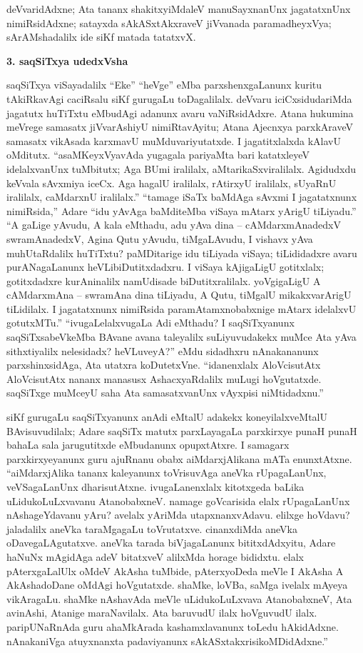 deVvaridAdxne; Ata tananx shakitxyiMdaleV manuSayxnanUnx jagatatxnUnx nimiRsidAdxne; satayxda sAkASxtAkxraveV jiVvanada paramadheyxVya; sArAMshadalilx ide siKf matada tatatxvX.

\bigskip
\begin{center}
{\Large\bf 3. saqSiTxya udedxVsha}
\end{center}

saqSiTxya viSayadalilx ``Eke'' ``heVge'' eMba parxshenxgaLanunx kuritu tAkiRkavAgi caciRsalu siKf gurugaLu toDagalilalx. deVvaru iciCxsidudariMda jagatutx huTiTxtu eMbudAgi adanunx avaru vaNiRsidAdxre. Atana hukumina meVrege samasatx jiVvarAshiyU nimiRtavAyitu; Atana Ajecnxya parxkAraveV samasatx vikAsada karxmavU muMduvariyutatxde. I jagatitxlalxda kAlavU oMditutx. ``asaMKeyxVyavAda yugagala pariyaMta bari katatxleyeV idelalxvanUnx tuMbitutx; Aga BUmi iralilalx, aMtarikaSxviralilalx. Agidudxdu keVvala sAvxmiya iceCx. Aga hagalU iralilalx, rAtirxyU iralilalx, sUyaRnU iralilalx, caMdarxnU iralilalx.'' ``tamage iSaTx baMdAga sAvxmi I jagatatxnunx nimiRsida,'' Adare ``idu yAvAga baMditeMba viSaya mAtarx yArigU tiLiyadu.'' ``A gaLige yAvudu, A kala eMthadu, adu yAva dina -- cAMdarxmAnadedxV swramAnadedxV, Agina Qutu yAvudu, tiMgaLAvudu, I vishavx yAva muhUtaRdalilx huTiTxtu? paMDitarige idu tiLiyada viSaya; tiLididadxre avaru purANagaLanunx heVLibiDutitxdadxru. I viSaya kAjigaLigU gotitxlalx; gotitxdadxre kurAninalilx namUdisade biDutitxralilalx. yoVgigaLigU A cAMdarxmAna -- swramAna dina tiLiyadu, A Qutu, tiMgalU mikakxvarArigU tiLidilalx. I jagatatxnunx nimiRsida paramAtamxnobabxnige mAtarx idelalxvU gotutxMTu.'' ``ivugaLelalxvugaLa Adi eMthadu? I saqSiTxyanunx saqSiTxsabeVkeMba BAvane avana taleyalilx suLiyuvudakekx muMce Ata yAva sithxtiyalilx nelesidadx? heVLuveyA?'' eMdu sidadhxru nAnakananunx parxshinxsidAga, Ata utatxra koDutetxVne. ``idanenxlalx AloVcisutAtx AloVcisutAtx nananx manasusx AshacxyaRdalilx muLugi hoVgutatxde. saqSiTxge muMceyU saha Ata samasatxvanUnx vAyxpisi niMtidadxnu.''

siKf gurugaLu saqSiTxyanunx anAdi eMtalU adakekx koneyilalxveMtalU BAvisuvudilalx; Adare saqSiTx matutx parxLayagaLa parxkirxye punaH punaH bahaLa sala jarugutitxde eMbudanunx opupxtAtxre. I samagarx parxkirxyeyanunx guru ajuRnanu obabx aiMdarxjAlikana mATa enunxtAtxne. ``aiMdarxjAlika tananx kaleyanunx toVrisuvAga aneVka rUpagaLanUnx, veVSagaLanUnx dharisutAtxne. ivugaLanenxlalx kitotxgeda baLika uLidukoLuLxvavanu AtanobabxneV. namage goVcarisida elalx rUpagaLanUnx nAshageYdavanu yAru? avelalx yAriMda utapxnanxvAdavu. elilxge hoVdavu? jaladalilx aneVka taraMgagaLu toVrutatxve. cinanxdiMda aneVka oDavegaLAgutatxve. aneVka tarada biVjagaLanunx bititxdAdxyitu, Adare haNuNx mAgidAga adeV bitatxveV alilxMda horage bididxtu. elalx pAterxgaLalUlx oMdeV AkAsha tuMbide, pAterxyoDeda meVle I AkAsha A AkAshadoDane oMdAgi hoVgutatxde. shaMke, loVBa, saMga ivelalx mAyeya vikAragaLu. shaMke nAshavAda meVle uLidukoLuLxvava AtanobabxneV, Ata avinAshi, Atanige maraNavilalx. Ata baruvudU ilalx hoVguvudU ilalx. paripUNaRnAda guru ahaMkArada kashamxlavanunx toLedu hAkidAdxne. nAnakaniVga atuyxnanxta padaviyanunx sAkASxtakxrisikoMDidAdxne.''

